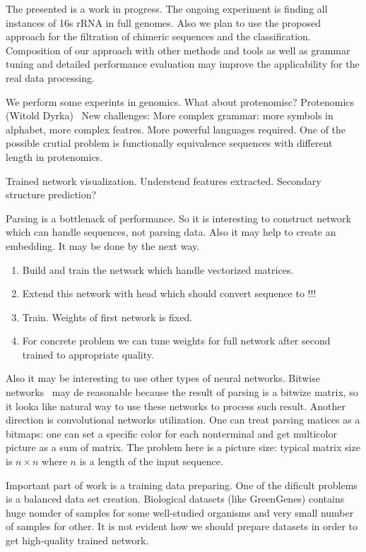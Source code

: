 \documentclass[a4paper,twoside]{article}
\begin{document}
\noindent The presented is a work in progress. 
The ongoing experiment is finding all instances of 16s rRNA in full genomes.
Also we plan to use the proposed approach for the filtration of chimeric sequences and the classification.
Composition of our approach with other methods and tools as well as grammar tuning and detailed performance evaluation may improve the applicability for the real data processing.

We perform some experints in genomics. 
What about protenomisc?
Protenomics (Witold Dyrka)~\cite{DBLP:Witold:Proteins}
New challenges: More complex grammar: more symbols in alphabet, more complex featres.
More powerful languages required.
One of the possible crutial problem is functionally equivalence sequences with different length in protenomics.

Trained network visualization.
Understend features extracted.
Secondary structure prediction?

Parsing is a bottlenack of performance.
So it is interesting to construct network which can handle sequences, not parsing data.
Also it may help to create an embedding.
It may be done by the next way.
\begin{enumerate}
\item Build and train the network which handle vectorized matrices.
\item Extend this network with head which should convert sequence to !!!
\item Train. Weights of first network is fixed.
\item For concrete problem we can tune weights for full network after second trained to appropriate quality.
\end{enumerate}

Also it may be interesting to use other types of neural networks.
Bitwise networks~\cite{DBLP:journals:corr:KimS16} may de reasonable because the result of parsing is a bitwize matrix, so it looka like natural way to use these networks to process such result. 
Another direction is convolutional networks utilization.
One can treat parsing matices as a bitmaps: one can set a specific color for each nonterminal and get multicolor picture as a sum of matrix.
The problem here is a picture size: typical matrix size is $n \times n$ where $n$ is a length of the input sequence.

Important part of work is a training data preparing.
One of the dificult problems is a balanced data set creation.
Biological datasets (like GreenGenes) contains huge nomder of samples for some well-studied organisms and very small number of samples for other.
It is not evident how  we should prepare datasets in order to get high-quality trained network.
\end{document}
